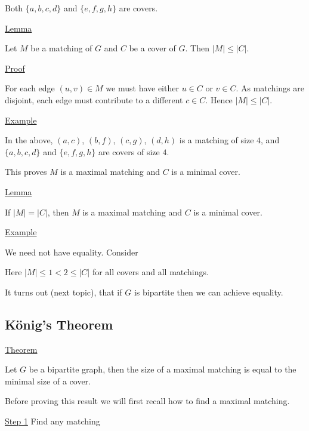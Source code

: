 \documentclass{article}
\begin{document}
Both $\{a,b,c,d\}$ and $\{e,f,g,h\}$ are covers.

\underline{Lemma}

Let $M$ be a matching of $G$ and $C$ be a cover of $G$. Then $|M| \le |C|$. 

\underline{Proof}

For each edge $(u,v) \in M$ we must have either $u \in C$ or $v \in C$. As matchings are disjoint, each edge must contribute to a different $c \in C$. Hence $|M| \le |C|$.

\underline{Example}

In the above, $(a,c)$, $(b,f)$, $(c,g)$, $(d,h)$ is a matching of size $4$, and $\{a,b,c,d\}$ and $\{e,f,g,h\}$ are covers of size $4$. 

This proves $M$ is a maximal matching and $C$ is a minimal cover. 

\underline{Lemma}

If $|M|=|C|$, then $M$ is a maximal matching and $C$ is a minimal cover. 

\underline{Example}

We need not have equality. Consider

\begin{center}
\end{center}

Here $|M| \le 1 < 2 \le |C|$ for all covers and all matchings.

It turns out (next topic), that if $G$ is bipartite then we can achieve equality. 

\subsection{König's Theorem}

\underline{Theorem}

Let $G$ be a bipartite graph, then the size of a maximal matching is equal to the minimal size of a cover. 

Before proving this result we will first recall how to find a maximal matching. 

\underline{Step 1} Find any matching
\end{document}
